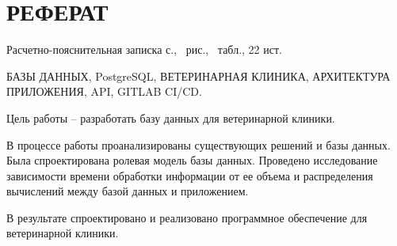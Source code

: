 \section*{РЕФЕРАТ}
\setcounter{page}{3}

Расчетно-пояснительная записка \pageref{LastPage} с., \totalfigures\ рис., \totaltables\ табл., 22 ист.

БАЗЫ ДАННЫХ, PostgreSQL, ВЕТЕРИНАРНАЯ КЛИНИКА, АРХИТЕКТУРА ПРИЛОЖЕНИЯ, API, GITLAB CI/CD.

Цель работы --  разработать базу данных для ветеринарной клиники.

В процессе работы проанализированы существующих решений и базы данных. Была спроектирована ролевая модель базы данных. Проведено исследование зависимости времени обработки информации от ее объема и распределения вычислений между базой данных и приложением. 

В результате спроектировано и реализовано программное обеспечение для ветеринарной клиники.
\pagebreak
